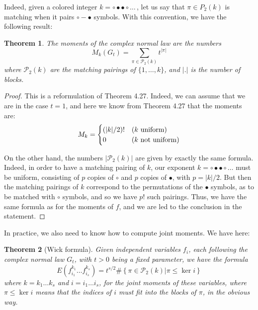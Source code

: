 \documentclass[12pt]{amsbook}
\newtheorem{theorem}{Theorem}[chapter]
\begin{document}
\bigskip

Indeed, given a colored integer $k=\circ\bullet\bullet\circ\ldots\,$, let us say that $\pi\in P_2(k)$ is matching when it pairs $\circ-\bullet$ symbols. With this convention, we have the following result:


\begin{theorem}
The moments of the complex normal law are the numbers
$$M_k(G_t)=\sum_{\pi\in\mathcal P_2(k)}t^{|\pi|}$$
where $\mathcal P_2(k)$ are the matching pairings of $\{1,\ldots,k\}$, and $|.|$ is the number of blocks.
\end{theorem}

\begin{proof}
This is a reformulation of Theorem 4.27. Indeed, we can assume that we are in the case $t=1$, and here we know from Theorem 4.27 that the moments are:
$$M_k=\begin{cases}
(|k|/2)!&(k\ {\rm uniform})\\
0&(k\ {\rm not\ uniform})
\end{cases}$$

On the other hand, the numbers $|\mathcal P_2(k)|$ are given by exactly the same formula. Indeed, in order to have a matching pairing of $k$, our exponent $k=\circ\bullet\bullet\circ\ldots$ must be uniform, consisting of $p$ copies of $\circ$ and $p$ copies of $\bullet$, with $p=|k|/2$. But then the matching pairings of $k$ correspond to the permutations of the $\bullet$ symbols, as to be matched with $\circ$ symbols, and so we have $p!$ such pairings. Thus, we have the same formula as for the moments of $f$, and we are led to the conclusion in the statement.
\end{proof}

In practice, we also need to know how to compute joint moments. We have here:


\begin{theorem}[Wick formula]
Given independent variables $f_i$, each following the complex normal law $G_t$, with $t>0$ being a fixed parameter, we have the formula
$$E\left(f_{i_1}^{k_1}\ldots f_{i_s}^{k_s}\right)=t^{s/2}\#\left\{\pi\in\mathcal P_2(k)\Big|\pi\leq\ker i\right\}$$
where $k=k_1\ldots k_s$ and $i=i_1\ldots i_s$, for the joint moments of these variables, where $\pi\leq\ker i$ means that the indices of $i$ must fit into the blocks of $\pi$, in the obvious way.
\end{theorem}
\end{document}
